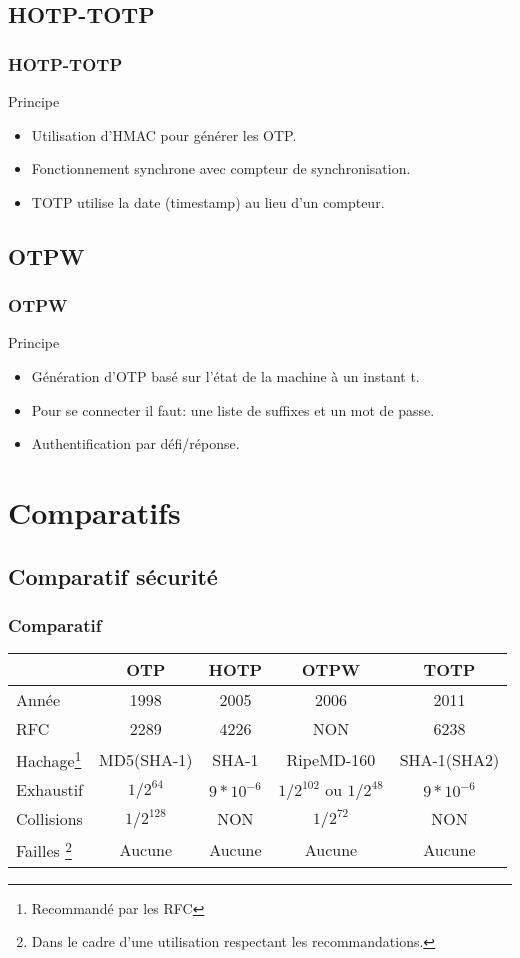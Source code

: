 \documentclass{beamer}
\begin{document}
\subsection{HOTP-TOTP}
\begin{frame}
\frametitle{HOTP-TOTP}
 \begin{block}{Principe}
 \begin{itemize}
 \item Utilisation d'HMAC pour générer les OTP.
 \item Fonctionnement synchrone avec compteur de synchronisation.
 \item TOTP utilise la date (timestamp) au lieu d'un compteur.
 \end{itemize}
 \end{block}
\end{frame}

\subsection{OTPW}
\begin{frame}
\frametitle{OTPW}
  \begin{block}{Principe}
   \begin{itemize}
    \item Génération d'OTP basé sur l'état de la machine à un instant t.
    \item Pour se connecter il faut: une liste de suffixes et un mot de passe.
    \item Authentification par défi/réponse.
   \end{itemize}
  \end{block}
\end{frame}


\section{Comparatifs}
\subsection{Comparatif sécurité}
\begin{frame}
  \frametitle{Comparatif}
  \begin{tabular}{|l|c|c|c|c|}
 \hline
 & OTP & HOTP & OTPW & TOTP\\
 \hline
 Année & 1998 & 2005 & 2006 & 2011 \\
 \hline
 RFC & 2289 & 4226 & NON & 6238 \\
 \hline
 Hachage\footnote{Recommandé par les RFC} & MD5(SHA-1) & SHA-1 & RipeMD-160 & SHA-1(SHA2)\\
 \hline
 Exhaustif & $1/2^{64}$ & $9*10^{-6} $ & $1/2^{102}$ ou $1/2^{48}$ & $9*10^{-6}$\\
 \hline
 Collisions & $1/2^{128}$ & NON & $1/2^{72}$ & NON\\
 \hline
 Failles \footnote{Dans le cadre d'une utilisation respectant les recommandations.} & Aucune & Aucune& Aucune &Aucune\\
 \hline
  \end{tabular}
\end{frame}
\end{document}
